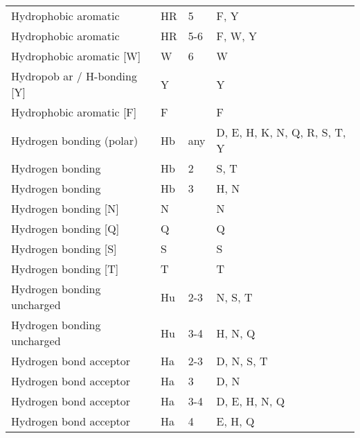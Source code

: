\begin{table}[H]
{\begin{tabular}{llll}
                    Hydrophobic aromatic &           HR &                5 &                          F, Y \\
                    Hydrophobic aromatic &           HR &              5-6 &                       F, W, Y \\
                Hydrophobic aromatic [W] &            W &                6 &                             W \\
             Hydropob ar / H-bonding [Y] &            Y &                  &                             Y \\
                Hydrophobic aromatic [F] &            F &                  &                             F \\
                Hydrogen bonding (polar) &           Hb &              any &  D, E, H, K, N, Q, R, S, T, Y \\
                        Hydrogen bonding &           Hb &                2 &                          S, T \\
                        Hydrogen bonding &           Hb &                3 &                          H, N \\
                    Hydrogen bonding [N] &            N &                  &                             N \\
                    Hydrogen bonding [Q] &            Q &                  &                             Q \\
                    Hydrogen bonding [S] &            S &                  &                             S \\
                    Hydrogen bonding [T] &            T &                  &                             T \\
              Hydrogen bonding uncharged &           Hu &              2-3 &                       N, S, T \\
              Hydrogen bonding uncharged &           Hu &              3-4 &                       H, N, Q \\
                  Hydrogen bond acceptor &           Ha &              2-3 &                    D, N, S, T \\
                  Hydrogen bond acceptor &           Ha &                3 &                          D, N \\
                  Hydrogen bond acceptor &           Ha &              3-4 &                 D, E, H, N, Q \\
                  Hydrogen bond acceptor &           Ha &                4 &                       E, H, Q \\

\end{tabular}}
\end{table}
